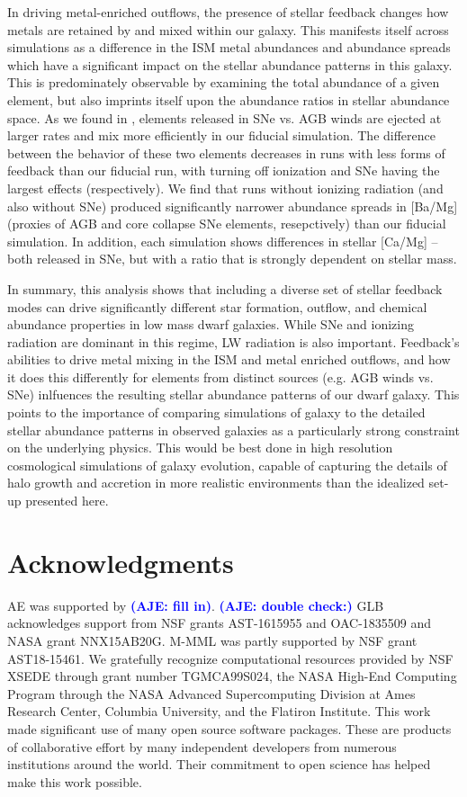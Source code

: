 \documentclass[twocolumn]{aastex62}
\newcommand{\aje}[1]{\textcolor{blue}{\textbf{(AJE: #1)}}}
\begin{document}
In driving metal-enriched outflows, the presence of stellar feedback changes how metals are retained by and mixed within our galaxy. This manifests itself across simulations as a difference in the ISM metal abundances and abundance spreads which have a significant impact on the stellar abundance patterns in this galaxy. This is predominately observable by examining the total abundance of a given element, but also imprints itself upon the abundance ratios in stellar abundance space. As we found in \citet{Emerick2018b}, elements released in SNe vs. AGB winds are ejected at larger rates and mix more efficiently in our fiducial simulation. The difference between the behavior of these two elements decreases in runs with less forms of feedback than our fiducial run, with turning off ionization and SNe having the largest effects (respectively). We find that runs without ionizing radiation (and also without SNe) produced significantly narrower abundance spreads in [Ba/Mg] (proxies of AGB and core collapse SNe elements, resepctively) than our fiducial simulation. In addition, each simulation shows differences in stellar [Ca/Mg] -- both released in SNe, but with a ratio that is strongly dependent on stellar mass.

In summary, this analysis shows that including a diverse set of stellar feedback modes can drive significantly different star formation, outflow, and chemical abundance properties in low mass dwarf galaxies. While SNe and ionizing radiation are dominant in this regime, LW radiation is also important. Feedback's abilities to drive metal mixing in the ISM and metal enriched outflows, and how it does this differently for elements from distinct sources (e.g. AGB winds vs. SNe) inlfuences the resulting stellar abundance patterns of our dwarf galaxy. This points to the importance of comparing simulations of galaxy to the detailed stellar abundance patterns in observed galaxies as a particularly strong constraint on the underlying physics. This would be best done in high resolution cosmological simulations of galaxy evolution, capable of capturing the details of halo growth and accretion in more realistic environments than the idealized set-up presented here.

\section*{Acknowledgments} AE was supported by \aje{fill in}. \aje{double check:} GLB acknowledges support from NSF grants AST-1615955 and OAC-1835509 and NASA grant NNX15AB20G. M-MML was partly supported by NSF grant AST18-15461. We gratefully recognize computational resources provided by NSF XSEDE through grant number TGMCA99S024, the NASA High-End Computing Program through the NASA Advanced Supercomputing Division at Ames Research Center, Columbia University, and the Flatiron Institute. This work made significant use of many open source software packages. These are products of collaborative effort by many independent developers from numerous institutions around the world. Their commitment to open science has helped make this work possible. 
\end{document}
